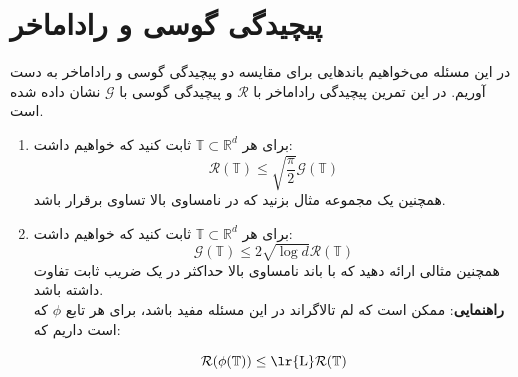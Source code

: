 \section{پیچیدگی گوسی و راداماخر}
در این مسئله می‌خواهیم باندهایی برای مقایسه دو پیچیدگی گوسی و راداماخر به دست آوریم. در این تمرین  پیچیدگی راداماخر با 
$\mathcal{R}$
و پیچیدگی گوسی با
$\mathcal{G}$
نشان داده‌ شده است.
\begin{enumerate}
    \item 
    برای هر 
    $\mathbb{T} \subset \mathbb{R}^d$
    ثابت کنید که خواهیم داشت:
    $$\mathcal{R}(\mathbb{T}) \leq \sqrt{\frac{\pi}{2}} \mathcal{G}(\mathbb{T})$$
    همچنین یک مجموعه مثال بزنید که در نامساوی بالا تساوی برقرار باشد.
    \item
برای هر 
    $\mathbb{T} \subset \mathbb{R}^d$
    ثابت کنید که خواهیم داشت:
    $$\mathcal{G}(\mathbb{T})  \leq  2 \sqrt{\log{d}}\mathcal{R}(\mathbb{T})$$
همچنین مثالی ارائه دهید که با باند نامساوی بالا حداکثر در یک ضریب ثابت تفاوت داشته باشد.\\

\textbf{راهنمایی}:
    ممکن است که لم تالاگراند در این مسئله مفید باشد، برای هر تابع
    $\phi$
    که
    است داریم که:
    
     $$\mathcal{R}(\phi(\mathbb{T})) \leq \text{\lr{L}}\mathcal{R}(\mathbb{T})$$
\end{enumerate}
